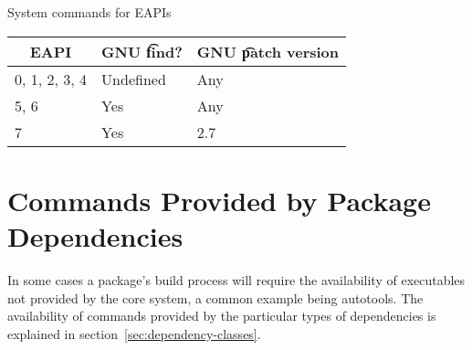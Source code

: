 \begin{centertable}{System commands for EAPIs}
    \label{tab:system-commands-table}
    \begin{tabular}{lll}
      \toprule
      \multicolumn{1}{c}{\textbf{EAPI}} &
      \multicolumn{1}{c}{\textbf{GNU \t{find}?}} &
      \multicolumn{1}{c}{\textbf{GNU \t{patch} version}} \\
      \midrule
      0, 1, 2, 3, 4     & Undefined & Any \\
      5, 6              & Yes       & Any \\
      7                 & Yes       & 2.7 \\
      \bottomrule
    \end{tabular}
\end{centertable}

\section{Commands Provided by Package Dependencies}

In some cases a package's build process will require the availability of executables not provided by
the core system, a common example being autotools. The availability of commands provided by the
particular types of dependencies is explained in section~\ref{sec:dependency-classes}.




